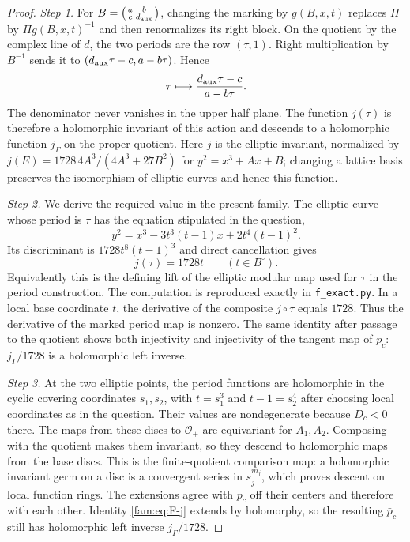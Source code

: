 \begin{proof}
\par\noindent\textit{Step 1.} For $B=\bigl(\begin{smallmatrix}a&b\\c&d_{\rm aux}\end{smallmatrix}\bigr)$, changing
the marking by $g(B,x,t)$ replaces $\Pi$ by $\Pi g(B,x,t)^{-1}$ and then
renormalizes its right block.  On the quotient by the complex line of
$d$, the two periods are the row $(\tau,1)$.  Right multiplication by
$B^{-1}$ sends it to $(d_{\rm aux}\tau-c,a-b\tau)$.  Hence
\begin{equation}\label{fam:eq:F-tauaction}
 \tau\longmapsto\frac{d_{\rm aux}\tau-c}{a-b\tau}.
\end{equation}
The denominator never vanishes in the upper half plane.  The function
$j(\tau)$ is therefore a holomorphic invariant of this action and
descends to a holomorphic function $j_\Gamma$ on the proper quotient.
Here $j$ is the elliptic invariant, normalized by
$j(E)=1728\,4A^3/(4A^3+27B^2)$ for $y^2=x^3+Ax+B$; changing a lattice
basis preserves the isomorphism of elliptic curves and hence this
function.

\par\noindent\textit{Step 2.} We derive the required value in the present family.  The elliptic curve
whose period is $\tau$ has the equation stipulated in the question,
\[
 y^2=x^3-3t^3(t-1)x+2t^4(t-1)^2.
\]
Its discriminant is $1728t^8(t-1)^3$ and direct cancellation gives
\begin{equation}\label{fam:eq:F-j}
 j(\tau)=1728t\qquad(t\in B^\circ).
\end{equation}
Equivalently this is the defining lift of the elliptic modular map used
for $\tau$ in the period construction.  The computation is reproduced
exactly in \texttt{f\_exact.py}.  In a local base coordinate $t$, the
derivative of the composite $j\circ\tau$ equals $1728$.  Thus the
derivative of the marked period map is nonzero.  The same identity after
passage to the quotient shows both injectivity and injectivity of the
tangent map of $p_c$: $j_\Gamma/1728$ is a holomorphic left inverse.

\par\noindent\textit{Step 3.} At the two elliptic points, the period functions are holomorphic in the
cyclic covering coordinates $s_1,s_2$, with $t=s_1^3$ and
$t-1=s_2^4$ after choosing local coordinates as in the question.  Their
values are nondegenerate because $D_c<0$ there.  The maps from these
discs to $\mathcal O_+$ are equivariant for $A_1,A_2$.  Composing with
the quotient makes them invariant, so they descend to holomorphic maps
from the base discs.  This is the finite-quotient comparison map: a
holomorphic invariant germ on a disc is a convergent series in $s_j^{m_j}$,
which proves descent on local function rings.  The extensions agree
with $p_c$ off their centers and therefore with each other.  Identity
\eqref{fam:eq:F-j} extends by holomorphy, so the resulting $\bar p_c$ still
has holomorphic left inverse $j_\Gamma/1728$.


\end{proof}
